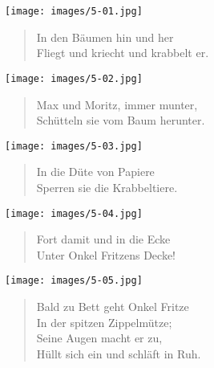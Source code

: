 \documentclass[a4paper,12pt]{article}
\begin{document}
\begin{center}\texttt{[image: images/5-01.jpg]}\end{center}



\begin{verse}
In den Bäumen hin und her\\{}
Fliegt und kriecht und krabbelt er.
\end{verse}



\begin{center}\texttt{[image: images/5-02.jpg]}\end{center}



\begin{verse}
Max und Moritz, immer munter,\\{}
Schütteln sie vom Baum herunter.
\end{verse}



\begin{center}\texttt{[image: images/5-03.jpg]}\end{center}



\begin{verse}
In die Düte von Papiere\\{}
Sperren sie die Krabbeltiere.
\end{verse}



\begin{center}\texttt{[image: images/5-04.jpg]}\end{center}



\begin{verse}
Fort damit und in die Ecke\\{}
Unter Onkel Fritzens Decke!
\end{verse}



\begin{center}\texttt{[image: images/5-05.jpg]}\end{center}



\begin{verse}
Bald zu Bett geht Onkel Fritze\\{}
In der spitzen Zippelmütze;\\{}
Seine Augen macht er zu,\\{}
Hüllt sich ein und schläft in Ruh.
\end{verse}
\end{document}
